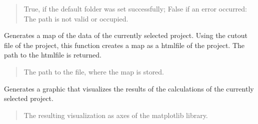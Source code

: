 \documentclass[letterpaper,10pt,english]{sphinxmanual}
\begin{document}
\begin{fulllineitems}
\begin{fulllineitems}
\begin{quote}
\begin{description}
\sphinxAtStartPar
True, if the default folder was set successfully; False if an error occurred: The path is not valid or occupied.

\sphinxAtStartPar
{}

\end{description}\end{quote}

\end{fulllineitems}


\begin{fulllineitems}
\label{\detokenize{apidoc/src.osm_configurator.control:src.osm_configurator.control.control.Control.generate_cut_out_map}}
\pysigstartsignatures
{}
\pysigstopsignatures
\sphinxAtStartPar
Generates a map of the data of the currently selected project.
Using the cut\sphinxhyphen{}out file of the project, this function creates a map as a html\sphinxhyphen{}file of the project. The path to the html\sphinxhyphen{}file is returned.
\begin{quote}\begin{description}
\sphinxAtStartPar
The path to the file, where the map is stored.

\sphinxAtStartPar
{}

\end{description}\end{quote}

\end{fulllineitems}


\begin{fulllineitems}
\label{\detokenize{apidoc/src.osm_configurator.control:src.osm_configurator.control.control.Control.get_calculation_visualization}}
\pysigstartsignatures
{}
\pysigstopsignatures
\sphinxAtStartPar
Generates a graphic that visualizes the results of the calculations of the currently selected project.
\begin{quote}\begin{description}
\sphinxAtStartPar
The resulting visualization as axes of the matplotlib library.


\end{description}
\end{quote}
\end{fulllineitems}
\end{fulllineitems}
\end{document}
